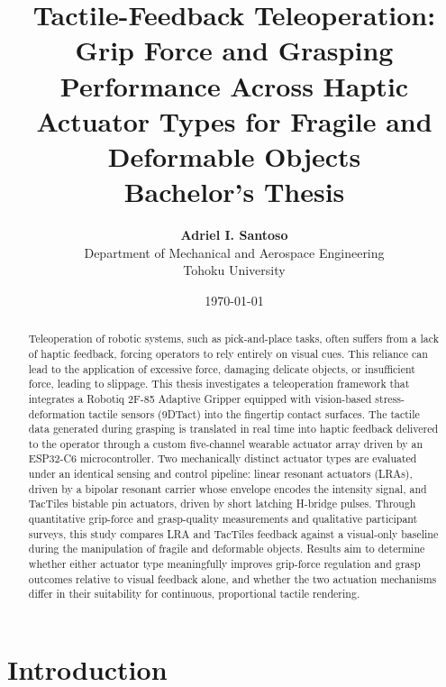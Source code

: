 \documentclass[12pt, a4paper]{report}
\title{
    \textbf{\Large Tactile-Feedback Teleoperation: Grip Force and Grasping Performance Across Haptic Actuator Types for Fragile and Deformable Objects}\\
    \vspace{1cm}
    \large Bachelor's Thesis
    \vspace{1cm}
}
\author{
    \textbf{Adriel I. Santoso}\\
    Department of Mechanical and Aerospace Engineering\\
    Tohoku University
}
\date{
    \vspace{2cm}
    \today
}
\begin{document}
\maketitle


\begin{abstract}
    Teleoperation of robotic systems, such as pick-and-place tasks, often suffers from a lack of haptic feedback, forcing operators to rely entirely on visual cues. This reliance can lead to the application of excessive force, damaging delicate objects, or insufficient force, leading to slippage. This thesis investigates a teleoperation framework that integrates a Robotiq 2F-85 Adaptive Gripper equipped with vision-based stress-deformation tactile sensors (9DTact) into the fingertip contact surfaces. The tactile data generated during grasping is translated in real time into haptic feedback delivered to the operator through a custom five-channel wearable actuator array driven by an ESP32-C6 microcontroller. Two mechanically distinct actuator types are evaluated under an identical sensing and control pipeline: linear resonant actuators (LRAs), driven by a bipolar resonant carrier whose envelope encodes the intensity signal, and TacTiles bistable pin actuators, driven by short latching H-bridge pulses. Through quantitative grip-force and grasp-quality measurements and qualitative participant surveys, this study compares LRA and TacTiles feedback against a visual-only baseline during the manipulation of fragile and deformable objects. Results aim to determine whether either actuator type meaningfully improves grip-force regulation and grasp outcomes relative to visual feedback alone, and whether the two actuation mechanisms differ in their suitability for continuous, proportional tactile rendering.
\end{abstract}

\pagebreak
\tableofcontents
\listoffigures
\listoftables
\pagebreak


\chapter{Introduction}
\end{document}
